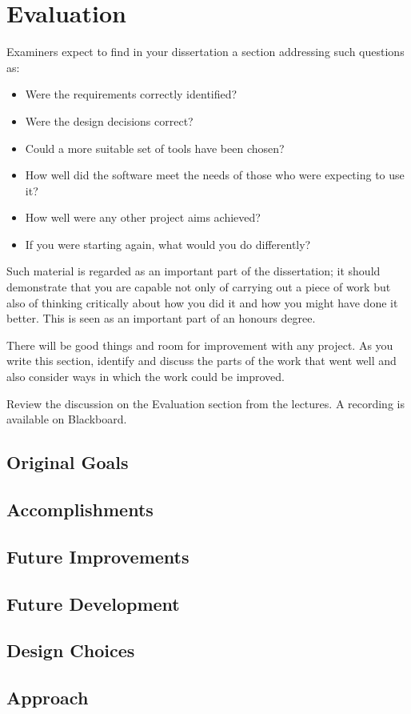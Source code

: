 \chapter{Evaluation}

Examiners expect to find in your dissertation a section addressing such questions as:

\begin{itemize}
   \item Were the requirements correctly identified? 
   \item Were the design decisions correct?
   \item Could a more suitable set of tools have been chosen?
   \item How well did the software meet the needs of those who were expecting to use it?
   \item How well were any other project aims achieved?
   \item If you were starting again, what would you do differently?
\end{itemize}

Such material is regarded as an important part of the dissertation; it should demonstrate that you are capable not only of carrying out a piece of work but also of thinking critically about how you did it and how you might have done it better. This is seen as an important part of an honours degree. 

There will be good things and room for improvement with any project. As you write this section, identify and discuss the parts of the work that went well and also consider ways in which the work could be improved. 

Review the discussion on the Evaluation section from the lectures. A recording is available on Blackboard. 
\section{Original Goals}
\section{Accomplishments}
\section{Future Improvements}
\section{Future Development}
\section{Design Choices}
\section{Approach}
